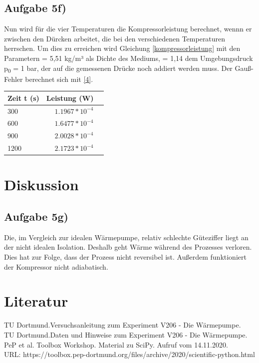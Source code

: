 \documentclass[titlepage=firstcover, captions=tableheading]{scrartcl}
\begin{document}
\subsection{Aufgabe 5f)}

Nun wird für die vier Temperaturen die Kompressorleistung berechnet, wennn er zwischen den Dürcken arbeitet,
die bei den verschiedenen Temperaturen herrschen.
Um dies zu erreichen wird Gleichung \eqref{kompressorleistung} mit den Parametern \rho = 5,51 kg/m³ als Dichte des Mediums,
\kappa = 1,14
dem Umgebungsdruck p\textsubscript{0} = 1 bar, der auf die gemessenen Drücke noch addiert werden muss. 
Der Gauß-Fehler berechnet sich mit \ref{4}.
\begin{center}
    \begin{tabular}{lrr}
        \toprule
        {Zeit t (s)}  & {Leistung (W)} \\
        \midrule
        300 & $1.1967*10^{-4}$ \\
        600 & $1.6477*10^{-4}$ \\
        900 &  $2.0028*10^{-4}$\\
        1200& $2.1723*10^{-4}$ \\
        \bottomrule
        
    \end{tabular}
\end{center}
\section{Diskussion}
\subsection{Aufgabe 5g)}

Die, im Vergleich zur idealen Wärmepumpe, relativ schlechte Güteziffer liegt an der nicht idealen Isolation.
Deshalb geht Wärme während des Prozesses verloren.
Dies hat zur Folge, dass der Prozess nicht reversibel ist. 
Außerdem funktioniert der Kompressor nicht adiabatisch.

\section{Literatur}
TU Dortmund.Versuchsanleitung zum Experiment V206 - Die Wärmepumpe.\\
TU Dortmund.Daten und Hinweise zum Experiment V206 - Die Wärmepumpe.\\
PeP et al. Toolbox Workshop. Material zu SciPy. Aufruf vom 14.11.2020.\\
URL: https://toolbox.pep-dortmund.org/files/archive/2020/scientific-python.html
\end{document}
